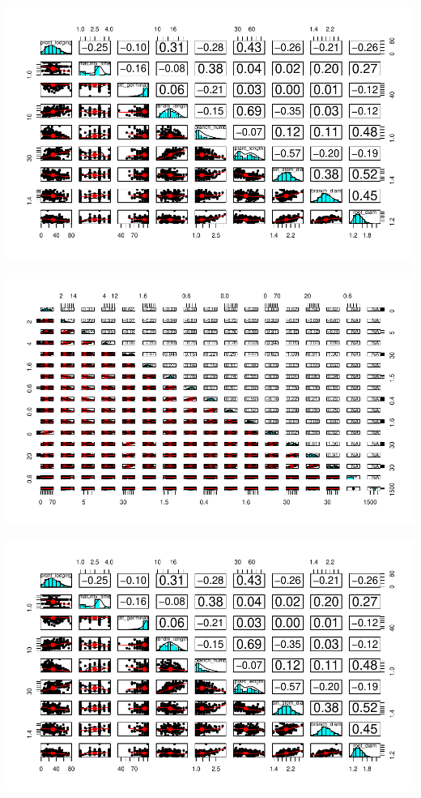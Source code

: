 \documentclass[11pt]{article}\usepackage[]{graphicx}\usepackage[]{color}
\makeatletter
\def\maxwidth{ %
  \ifdim\Gin@nat@width>\linewidth
    \linewidth
  \else
    \Gin@nat@width
  \fi
}
\newenvironment{knitrout}{}{} %
\makeatother
\begin{document}
\begin{knitrout}\footnotesize
{}\color{fgcolor}

{\centering \includegraphics[width=\maxwidth]{figure/moc-1} 

}




{\centering \includegraphics[width=\maxwidth]{figure/moc-2} 

}




{\centering \includegraphics[width=\maxwidth]{figure/moc-3} 

}



\end{knitrout}
\end{document}
